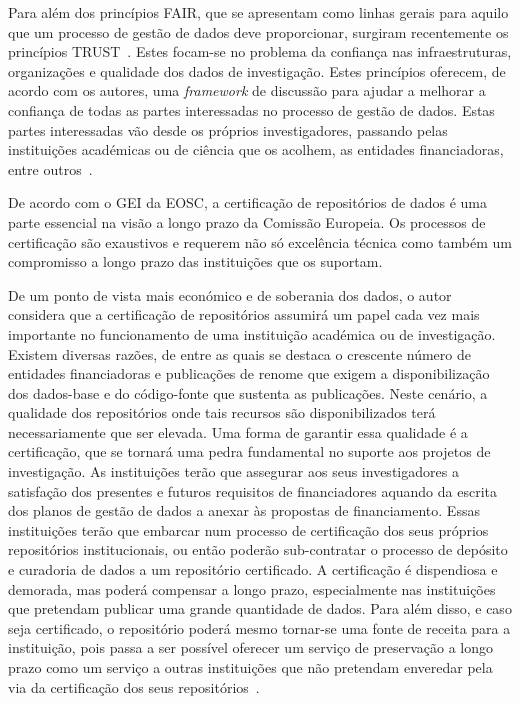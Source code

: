 \documentclass[sigconf,nonacm]{acmart}
\begin{document}
Para além dos princípios \gls{FAIR}, que se apresentam como linhas gerais para aquilo que um processo de gestão de dados deve proporcionar, surgiram recentemente os princípios \gls{TRUST}~\cite{TRUSTprinciples}. Estes focam-se no problema da confiança nas infraestruturas, organizações e qualidade dos dados de investigação. Estes princípios oferecem, de acordo com os autores, uma \emph{framework} de discussão para ajudar a melhorar a confiança de todas as partes interessadas no processo de gestão de dados. Estas partes interessadas vão desde os próprios investigadores, passando pelas instituições académicas ou de ciência que os acolhem, as entidades financiadoras, entre outros~\cite{DCC_stakeholders}.

De acordo com o \gls{GEI} da \gls{EOSC}, a certificação de repositórios de dados é uma parte essencial na visão a longo prazo da Comissão Europeia. Os processos de certificação são exaustivos e requerem não só excelência técnica como também um compromisso a longo prazo das instituições que os suportam.

De um ponto de vista mais económico e de soberania dos dados, o autor considera que a certificação de repositórios assumirá um papel cada vez mais importante no funcionamento de uma instituição académica ou de investigação. 
%
Existem diversas razões, de entre as quais se destaca o crescente número de entidades financiadoras e publicações de renome que exigem a disponibilização dos dados-base e do código-fonte que sustenta as publicações. 
%
Neste cenário, a qualidade dos repositórios onde tais recursos são disponibilizados terá necessariamente que ser elevada. Uma forma de garantir essa qualidade é a certificação, que se tornará uma pedra fundamental no suporte aos projetos de investigação. As instituições terão que assegurar aos seus investigadores a satisfação dos presentes e futuros requisitos de financiadores aquando da escrita dos planos de gestão de dados a anexar às propostas de financiamento. 
%
Essas instituições terão que embarcar num processo de certificação dos seus próprios repositórios institucionais, ou então poderão sub-contratar o processo de depósito e curadoria de dados a um repositório certificado. A certificação é dispendiosa e demorada, mas poderá compensar a longo prazo, especialmente nas instituições que pretendam publicar uma grande quantidade de dados. Para além disso, e caso seja certificado, o repositório poderá mesmo tornar-se uma fonte de receita para a instituição, pois passa a ser possível oferecer um serviço de preservação a longo prazo como um serviço a outras instituições que não pretendam enveredar pela via da certificação dos seus repositórios~\cite{Lindlar_Schwab_2019}.
\end{document}
